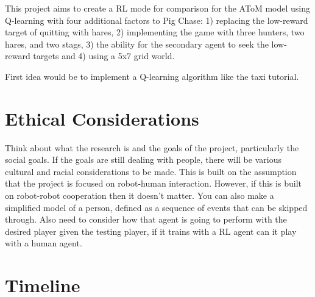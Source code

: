 \documentclass[10pt,twocolumn]{article}
\begin{document}
This project aims to create a RL mode for comparison for the AToM model using Q-learning with four additional factors to Pig Chase: 1) replacing the low-reward target of quitting with hares, 2) implementing the game with three hunters, two hares, and two stags, 3) the ability for the secondary agent to seek the low-reward targets and 4) using a 5x7 grid world.

First idea would be to implement a Q-learning algorithm like the taxi tutorial.

\section{Ethical Considerations}

Think about what the research is and the goals of the project, particularly the social goals. If the goals are still dealing with people, there will be various cultural and racial considerations to be made. This is built on the assumption that the project is focused on robot-human interaction. However, if this is built on robot-robot cooperation then it doesn’t matter. You can also make a simplified model of a person, defined as a sequence of events that can be skipped through. Also need to consider how that agent is going to perform with the desired player given the testing player, if it trains with a RL agent can it play with a human agent.

\section{Timeline}
\end{document}
